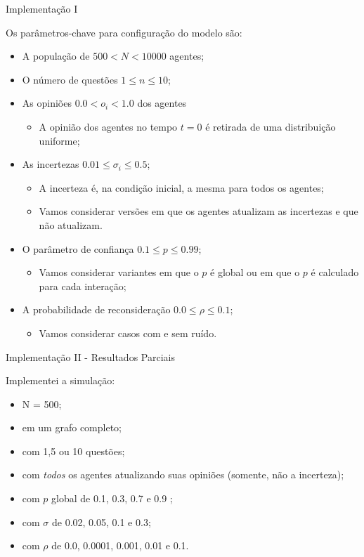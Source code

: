 \documentclass{beamer}
\begin{document}
\begin{frame}{Implementação I}

Os parâmetros-chave para configuração do modelo são:
\begin{itemize}
\item A população de \(500 < N < 10000\) agentes;
\item O número de questões \(1 \leq n \leq 10\); 
\item As opiniões \(0.0< o_i< 1.0\) dos agentes
  \begin{itemize}
  \item A opinião dos agentes no tempo \(t = 0\) é retirada de uma distribuição
    uniforme;
  \end{itemize}
\item As incertezas \(0.01 \leq \sigma_i \leq 0.5\);
  \begin{itemize}
  \item A incerteza é, na condição inicial, a mesma para todos os agentes;
  \item Vamos considerar versões em que os agentes atualizam as incertezas e que
    não atualizam.
  \end{itemize}

\item O parâmetro de confiança \(0.1 \leq p \leq 0.99\);
  \begin{itemize}
  \item Vamos considerar variantes em que o \(p\) é global ou em que o \(p\) é
    calculado para cada interação;
  \end{itemize}
  
\item A probabilidade de reconsideração \(0.0 \leq \rho  \leq 0.1\);
  \begin{itemize}
  \item Vamos considerar casos com e sem ruído.
  \end{itemize}
\end{itemize}
\end{frame}


\begin{frame}{Implementação II - Resultados Parciais}

Implementei a simulação:
\begin{itemize}
  \item N = 500;
\item em um grafo completo;
\item  com 1,5 ou 10 questões;
\item com \textit{todos} os agentes atualizando suas opiniões (somente, não a incerteza);
\item com \(p\) global de 0.1, 0.3, 0.7 e 0.9 ; 
\item com \(\sigma\) de 0.02, 0.05, 0.1 e 0.3;
  \item com \(\rho\) de 0.0, 0.0001, 0.001, 0.01 e 0.1.
\end{itemize}
\end{frame}
\end{document}

